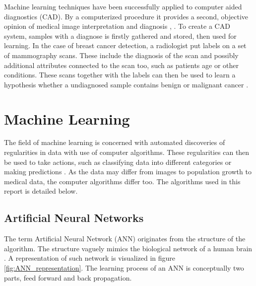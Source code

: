 Machine learning techniques have been successfully applied to computer aided diagnostics (CAD). By a computerized procedure it provides a second, objective opinion of medical image interpretation and diagnosis \parencite{li2007}, \parencite{ni2016}. To create a CAD system, samples with a diagnose is firstly gathered and stored, then used for learning. In the case of breast cancer detection, a radiologist put labels on a set of mammography scans. These include the diagnosis of the scan and possibly additional attributes connected to the scan too, such as patients age or other conditions. These scans together with the labels can then be used to learn a hypothesis whether a undiagnosed sample contains benign or malignant cancer \parencite{li2007}.


\section{Machine Learning}

The field of machine learning is concerned with automated discoveries of regularities in data with use of computer algorithms. These regularities can then be used to take actions, such as classifying data into different categories or making predictions \parencite{Bishop:2006}. As the data may differ from images to population growth to medical data, the computer algorithms differ too. The algorithms used in this report is detailed below.

\subsection{Artificial Neural Networks}

The term Artificial Neural Network (ANN) originates from the structure of the algorithm. The structure vaguely mimics the biological network of a human brain \parencite{Bishop:2006}. A representation of such network is visualized in figure \ref{fig:ANN_representation}. The learning process of an ANN is conceptually two parts, feed forward and back propagation.

